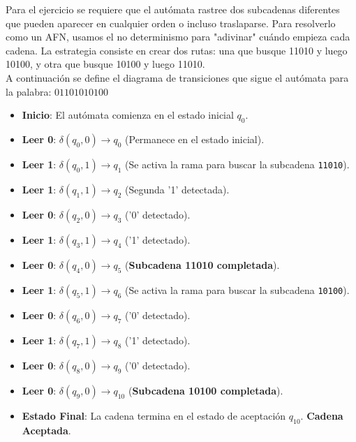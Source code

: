 \documentclass[12pt]{article}
\begin{document}
\begin{enumerate}
\begin{center}
\begin{minipage}{0.45\textwidth}
\begin{center}
\begin{tabular}{c|cc}
            \end{tabular}
            \end{center}
        \end{minipage}
        \hfill
        \begin{minipage}{0.45\textwidth}
        Para el ejercicio se requiere que el autómata rastree dos subcadenas diferentes que pueden aparecer en cualquier orden o incluso traslaparse. Para resolverlo como un AFN, usamos el no determinismo para "adivinar" cuándo empieza cada cadena. La estrategia consiste en crear dos rutas: una que busque 11010 y luego 10100, y otra que busque 10100 y luego 11010.\\
        A continuación se define el diagrama de transiciones que sigue el autómata para la palabra: $01101010100$
        \end{minipage}
        \begin{itemize}
            \item \textbf{Inicio}: El autómata comienza en el estado inicial $q_0$.
            \item \textbf{Leer 0}: $\delta(q_0, 0) \to q_0$ (Permanece en el estado inicial).
            \item \textbf{Leer 1}: $\delta(q_0, 1) \to q_1$ (Se activa la rama para buscar la subcadena \texttt{11010}).
            \item \textbf{Leer 1}: $\delta(q_1, 1) \to q_2$ (Segunda '1' detectada).
            \item \textbf{Leer 0}: $\delta(q_2, 0) \to q_3$ ('0' detectado).
            \item \textbf{Leer 1}: $\delta(q_3, 1) \to q_4$ ('1' detectado).
            \item \textbf{Leer 0}: $\delta(q_4, 0) \to q_5$ (\textbf{Subcadena 11010 completada}).
            \item \textbf{Leer 1}: $\delta(q_5, 1) \to q_6$ (Se activa la rama para buscar la subcadena \texttt{10100}).
            \item \textbf{Leer 0}: $\delta(q_6, 0) \to q_7$ ('0' detectado).
            \item \textbf{Leer 1}: $\delta(q_7, 1) \to q_8$ ('1' detectado).
            \item \textbf{Leer 0}: $\delta(q_8, 0) \to q_9$ ('0' detectado).
            \item \textbf{Leer 0}: $\delta(q_9, 0) \to q_{10}$ (\textbf{Subcadena 10100 completada}).
            \item \textbf{Estado Final}: La cadena termina en el estado de aceptación $q_{10}$. \textbf{Cadena Aceptada}.
            \end{itemize}
    \end{center}
\end{enumerate}
\end{document}
